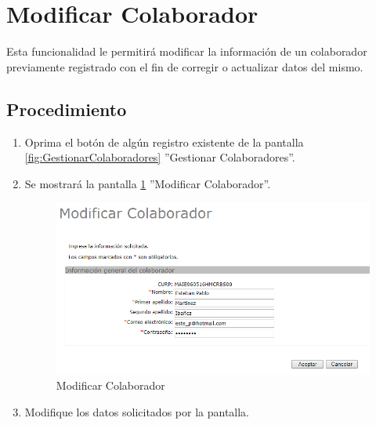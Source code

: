 \hypertarget{cv:modificarColaborador}{\section{Modificar Colaborador}} \label{sec:modificarColaborador}

	Esta funcionalidad le permitirá modificar la información de un colaborador previamente registrado con el fin de corregir o actualizar datos del mismo. 

		\subsection{Procedimiento}

			\begin{enumerate}
	
			\item Oprima el botón \IUEditar{} de algún registro existente de la pantalla \ref{fig:GestionarColaboradores} ''Gestionar Colaboradores''.
	
			\item Se mostrará la pantalla \ref{fig:modificarColaborador} ''Modificar Colaborador''.
			
			\begin{figure}[htbp!]
				\begin{center}
					\includegraphics[scale=0.6]{roles/administrador/colaboradores/gestionarColaboradores/pantallas/IU3-2modificarPersona}
					\caption{Modificar Colaborador}
					\label{fig:modificarColaborador}
				\end{center}
			\end{figure}
		
			\item Modifique los datos solicitados por la pantalla.
						

\end{enumerate}
